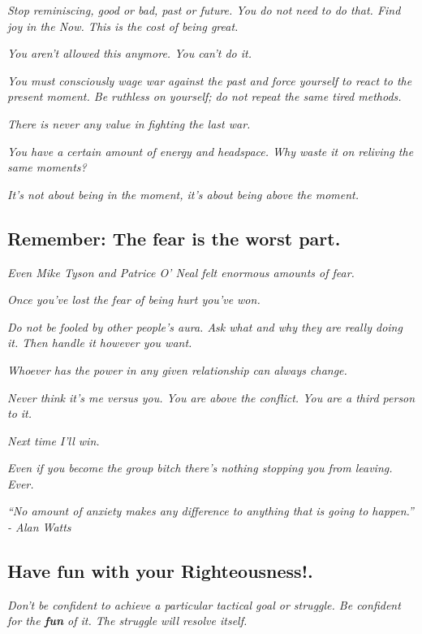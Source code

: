 \documentclass[12pt]{article}
\begin{document}
\textit{Stop reminiscing, good or bad, past or future.  You do not need to do that.  Find joy in the Now.  This is the cost of being great.}

\textit{You aren't allowed this anymore.  You can't do it.}

\textit{You must consciously wage war against the past and force yourself to react to the present moment. Be ruthless on yourself; do not repeat the same tired methods.}

\textit{There is never any value in fighting the last war.}

\textit{You have a certain amount of energy and headspace.  Why waste it on reliving the same moments?}

\textit{It's not about being in the moment, it's about being above the moment.}
\pagebreak



\subsection*{Remember: The fear is the worst part.}

\textit{Even Mike Tyson and Patrice O' Neal felt enormous amounts of fear.}

\textit{Once you've lost the fear of being hurt you've won.}

\textit{Do not be fooled by other people's aura.  Ask what and why they are really doing it.  Then handle it however you want.}

\textit{Whoever has the power in any given relationship can always change.}

\textit{Never think it's me versus you.  You are above the conflict.  You are a third person to it.}

\textit{Next time I'll win.}

\textit{Even if you become the group bitch there's nothing stopping you from leaving.  Ever.}

\textit{“No amount of anxiety makes any difference to anything that is going to happen.” - Alan Watts}

\pagebreak

\subsection*{Have fun with your Righteousness!.}
\textit{Don't be confident to achieve a particular tactical goal or struggle.  Be confident for the \textbf{fun} of it.  The struggle will resolve itself.}
\end{document}
